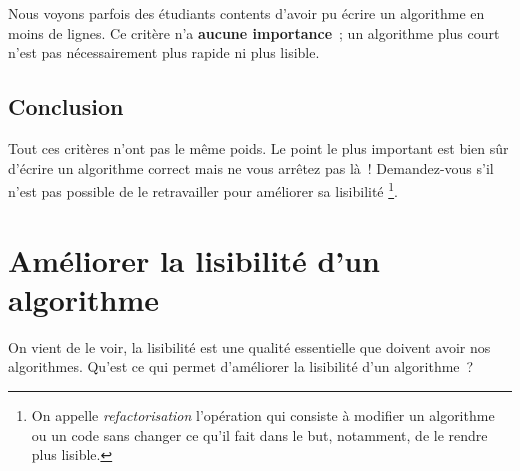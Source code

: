 			Nous voyons parfois des étudiants contents d’avoir
			pu écrire un algorithme en moins de lignes.
			Ce critère n’a \textbf{aucune importance}~;
			un algorithme plus court n’est pas nécessairement
			plus rapide ni plus lisible.
		
		\subsection{Conclusion}
			
			Tout ces critères n’ont pas le même poids.
			Le point le plus important est bien sûr d’écrire
			un algorithme correct mais ne vous arrêtez pas là~!
			Demandez-vous s’il n’est pas possible de le retravailler
			pour améliorer sa lisibilité%
			\footnote{%
				On appelle \emph{refactorisation}
				l’opération qui consiste à modifier
				un algorithme ou un code
				sans changer ce qu’il fait
				dans le but,
				notamment, de le rendre plus lisible.
			}.
		
	\section{Améliorer la lisibilité d’un algorithme}\label{lisibilite}
		
		On vient de le voir, la lisibilité est une qualité essentielle
		que doivent avoir nos algorithmes.
		Qu’est ce qui permet d’améliorer la lisibilité d’un algorithme~?
		
